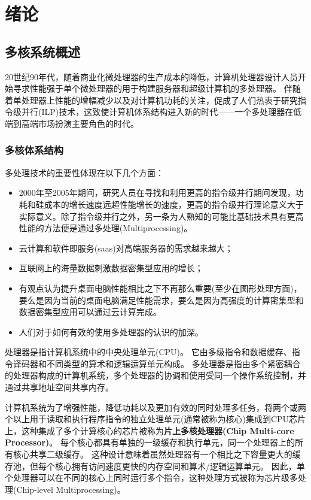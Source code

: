 \chapter{绪\quad 论}

\section{多核系统概述}
20世纪90年代，随着商业化微处理器的生产成本的降低，计算机处理器设计人员开始寻求性能强于单个微处理器的用于构建服务器和超级计算机的多处理器。
伴随着单处理器上性能的增幅减少以及对计算机功耗的关注，促成了人们热衷于研究指令级并行(ILP)技术，这致使计算机体系结构进入新的时代——一个多处理器在低端到高端市场扮演主要角色的时代。

\subsection{多核体系结构}
多处理技术的重要性体现在以下几个方面：
\begin{itemize}
	\item 2000年至2005年期间，研究人员在寻找和利用更高的指令级并行期间发现，功耗和硅成本的增长速度远超性能增长的速度，更高的指令级并行理论意义大于实际意义。除了指令级并行之外，另一条为人熟知的可能比基础技术具有更高性能的方法便是通过多处理(Multiprocessing)。
	\item 云计算和软件即服务(saas)对高端服务器的需求越来越大；
	\item 互联网上的海量数据刺激数据密集型应用的增长；
	\item 有观点认为提升桌面电脑性能相比之下不再那么重要(至少在图形处理方面)，要么是因为当前的桌面电脑满足性能需求，要么是因为高强度的计算密集型和数据密集型应用可以通过云计算完成。
	\item 人们对于如何有效的使用多处理器的认识的加深。
\end{itemize}

处理器是指计算机系统中的中央处理单元(CPU)。
它由多级指令和数据缓存、指令译码器和不同类型的算术和逻辑运算单元构成。
多处理器是指由多个紧密耦合的处理器构成的计算机系统，多个处理器的协调和使用受同一个操作系统控制，并通过共享地址空间共享内存\cite{hennessy2011computer}。

计算机系统为了增强性能，降低功耗以及更加有效的同时处理多任务，将两个或两个以上用于读取和执行程序指令的独立处理单元(通常被称为核心)集成到CPU芯片上，这种集成了多个计算核心的芯片被称为\textbf{片上多核处理器(Chip Multi-core Processor)}\cite{geer2005chip}。
每个核心都具有单独的一级缓存和执行单元，同一个处理器上的所有核心共享二级缓存。
这种设计意味着虽然处理器有一个相比之下容量更大的缓存池，但每个核心拥有访问速度更快的内存空间和算术/逻辑运算单元。
因此，单个处理器可以在不同的核心上同时运行多个指令，这种处理方式被称为芯片级多处理(Chip-level Multiprocessing)。

